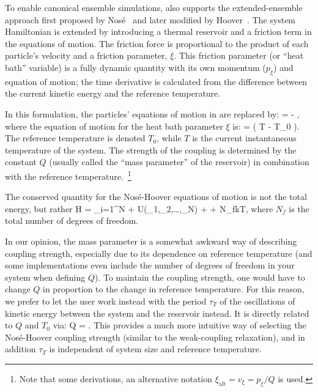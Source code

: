 To enable canonical ensemble simulations, {\gromacs} also supports the
extended-ensemble approach first proposed by Nos{\'e}~\cite{Nose84}
and later modified by Hoover~\cite{Hoover85}. The system Hamiltonian is
extended by introducing a thermal reservoir and a friction term in the
equations of motion.  The friction force is proportional to the
product of each particle's velocity and a friction parameter, $\xi$.
This friction parameter (or ``heat bath'' variable) is a fully
dynamic quantity with its own momentum ($p_{\xi}$) and equation of
motion; the time derivative is calculated from the difference between
the current kinetic energy and the reference temperature.  

In this formulation, the particles' equations of motion in
 are replaced by:
\beq
{} =  - 
 ,
\label{eqn:NH-eqn-of-motion}
\eeq where the equation of motion for the heat bath parameter $\xi$ is:
\beq {} = \left( T - T_0 \right).  \eeq The
reference temperature is denoted $T_0$, while $T$ is the current
instantaneous temperature of the system. The strength of the coupling
is determined by the constant $Q$ (usually called the ``mass parameter''
of the reservoir) in combination with the reference
temperature.~\footnote{Note that some derivations, an alternative
  notation $\xi_{\mathrm{alt}} = v_{\xi} = p_{\xi}/Q$ is used.}

The conserved quantity for the Nos{\'e}-Hoover equations of motion is not 
the total energy, but rather
\bea
H = \sum_{i=1}^{N}  + U\left(\rv_1,\rv_2,\ldots,\rv_N\right) + + N_fkT\xi,
\eea
where $N_f$ is the total number of degrees of freedom.

In our opinion, the mass parameter is a somewhat awkward way of
describing coupling strength, especially due to its dependence on
reference temperature (and some implementations even include the
number of degrees of freedom in your system when defining $Q$).  To
maintain the coupling strength, one would have to change $Q$ in
proportion to the change in reference temperature. For this reason, we
prefer to let the {\gromacs} user work instead with the period
$\tau_T$ of the oscillations of kinetic energy between the system and
the reservoir instead. It is directly related to $Q$ and $T_0$ via:
\beq
Q = .
\eeq
This provides a much more intuitive way of selecting the
Nos{\'e}-Hoover coupling strength (similar to the weak-coupling
relaxation), and in addition $\tau_T$ is independent of system size
and reference temperature.

